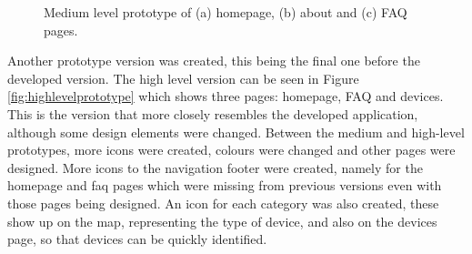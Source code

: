 \begin{figure}
\begin{subfigure}{0.33\textwidth}
        \caption{}
        \label{fig:mediumfaq}
    \end{subfigure}%
    \caption{Medium level prototype of (a) homepage, (b) about and (c) FAQ pages.}
    \label{fig:mediumlevelprototype}
\end{figure}

Another prototype version was created, this being the final one before
the developed version. The high level version can be seen in Figure \ref{fig:highlevelprototype}
which shows three pages: homepage, FAQ and \hyperlink{\acronym}{\acronym} devices. This is the version
that more closely resembles the developed application, although some design
elements were changed. Between the medium and high-level prototypes, more icons
were created, colours were changed and other pages were designed. More icons
to the navigation footer were created, namely for the homepage and faq pages
which were missing from previous versions even with those pages being designed.
An icon for each category was also created, these show up on the map, representing
the type of device, and also on the devices page, so that devices can be quickly
identified.

